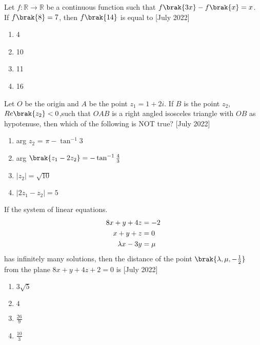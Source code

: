 
\iffalse
  \title{Assignment}
  \author{ai24btech11019}
  \section{mcq-single}
\fi
	\item Let $f: \mathbb{R} \rightarrow \mathbb{R}$ be a continuous function such that $f\brak{3x} - f\brak{x} = x$. If $f\brak{8} = 7$, then $f\brak{14}$ is equal to \hfill{[July 2022]}
    \begin{multicols}{2}
    \begin{enumerate}
        \item 4
        \item 10
        \item 11
        \item 16
    \end{enumerate}
     \end{multicols} 
     \item Let $O$ be the origin and $A$ be the point $z_1 = 1 + 2 i$. If $B$ is the point $z_2$, $Re\brak{z_2} < 0$,such that $OAB$ is a right angled isosceles triangle with $OB$ as hypotenuse, then which of the following is NOT true? \hfill{[July 2022]}
     \begin{multicols}{2}
     \begin{enumerate}
         \item arg $z_2$ = $\pi - \tan^{-1}{3}$
         \item arg $\brak{z_1 - 2 z_2} = -\tan^{-1}\frac{4}{3}$
         \item $|z_2 | = \sqrt{10}$
         \item $|2z_1 - z_2| = 5$
     \end{enumerate}
         
     \end{multicols}
     \item If the system of linear equations.
     \begin{align}
         8x+y+4z &= -2         \notag\\ 
         x+y+z &= 0             \notag\\
         \lambda x-3y &= \mu     \notag
     \end{align}
     has infinitely many solutions, then the distance of the point $\brak{\lambda,\mu,-\frac{1}{2}}$ from the plane $8x +y+4z+2=0$ is \hfill{[July 2022]}
     \begin{multicols}{2}
     \begin{enumerate}
         \item $3\sqrt{5}$
         \item $4$
         \item $\frac{26}{9}$
         \item $\frac{10}{3}$
     \end{enumerate}
        \end{multicols}
